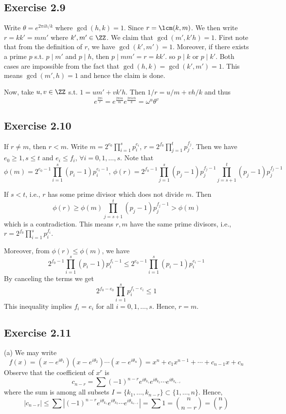 \documentclass[../Chapter.tex]{subfiles}
\begin{document}
\subsection*{Exercise 2.9}

Write $\theta=e^{2\pi ih/k}$ where $\gcd(h,k)=1$. Since $r=\lcm(k,m)$. We then write $r=kk'=mm'$ where $k',m'\in\ZZ$. We claim that $\gcd(m',k'h)=1$. First note that from the definition of $r$, we have $\gcd(k',m')=1$. Moreover, if there exists a prime $p$ s.t. $p\mid m'$ and $p\mid h$, then $p\mid mm'=r=kk'$. so $p\mid k$ or $p\mid k'$. Both cases are impossible from the fact that $\gcd(h,k)=\gcd(k',m')=1$. This means $\gcd(m',h)=1$ and hence the claim is done.

Now, take $u,v\in\ZZ$ s.t. $1=um'+vk'h$. Then $1/r=u/m+vh/k$ and thus $$e^{\frac{2\pi i}{r}}=e^{\frac{2\pi iu}{m}}e^{\frac{2\pi ivh}{k}}=\omega^u\theta^v$$

\subsection*{Exercise 2.10}

If $r\neq m$, then $r<m$. Write $m=2^{e_0}\prod_{i=1}^s p_i^{e_i}$, $r=2^{f_0}\prod_{j=1}^t p_j^{f_j}$. Then we have $e_0\geq 1,s\leq t$ and
$e_i\leq f_i$, $\forall i=0,1,\ldots,s$. Note that $$\phi(m)=2^{e_0-1}\prod_{i=1}^s (p_i-1)p_i^{e_i-1},\ \phi(r)=2^{f_0-1}\prod_{j=1}^s (p_j-1)p_j^{f_j-1}\prod_{j=s+1}^t (p_j-1)p_j^{f_j-1}$$

If $s<t$, i.e., $r$ has some prime divisor which does not divide $m$. Then $$\phi(r)\geq \phi(m)\prod_{j=s+1}^t (p_j-1)p_j^{f_j-1} > \phi(m)$$ which is a contradiction. This means $r,m$ have the same prime divisors, i.e., $r=2^{f_0}\prod_{i=1}^s p_i^{f_i}$.

Moreover, from $\phi(r)\leq \phi(m)$, we have $$2^{f_0-1}\prod_{i=1}^s (p_i-1)p_i^{f_i-1}\leq 2^{e_0-1}\prod_{i=1}^s (p_i-1)p_i^{e_i-1}$$ By canceling the terms we get $$2^{f_0-e_0}\prod_{i=1}^s p_i^{f_i-e_i}\leq 1$$ This inequality implies $f_i=e_i$ for all $i=0,1,\ldots,s$. Hence, $r=m$.
\subsection*{Exercise 2.11}

(a) We may write $$f(x)=(x-e^{i\theta_1})(x-e^{i\theta_2})\cdots(x-e^{i\theta_n})=x^n+c_1x^{n-1}+\cdots+c_{n-1}x+c_n$$ Observe that the coefficient of $x^r$ is $$c_{n-r}=\sum (-1)^{n-r}e^{i\theta_{k_1}}e^{i\theta_{k_2}}\cdots e^{i\theta_{k_{n-r}}}$$ where the sum is among all subsets $I=\{k_1,\ldots,k_{n-r}\} \subset \{1,\ldots,n\}$. Hence, $$|c_{n-r}|\leq \sum \left|(-1)^{n-r}e^{i\theta_{k_1}}e^{i\theta_{k_2}}\cdots e^{i\theta_{k_{n-r}}}\right| =\sum 1=\binom{n}{n-r}=\binom{n}{r}$$
\end{document}
